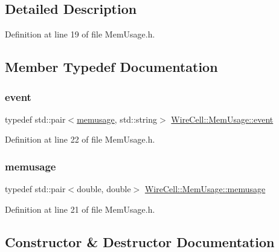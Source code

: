\subsection{Detailed Description}


Definition at line 19 of file Mem\+Usage.\+h.



\subsection{Member Typedef Documentation}
\mbox{\label{class_wire_cell_1_1_mem_usage_ac40a9ad5d6984d90924a179ca77aab3b}} 
\subsubsection{\texorpdfstring{event}{event}}
{\footnotesize\ttfamily typedef std\+::pair$<$\hyperlink{class_wire_cell_1_1_mem_usage_ab022bc829c4166d0161f3c91195f062f}{memusage}, std\+::string$>$ \hyperlink{class_wire_cell_1_1_mem_usage_ac40a9ad5d6984d90924a179ca77aab3b}{Wire\+Cell\+::\+Mem\+Usage\+::event}}



Definition at line 22 of file Mem\+Usage.\+h.

\mbox{\label{class_wire_cell_1_1_mem_usage_ab022bc829c4166d0161f3c91195f062f}} 
\subsubsection{\texorpdfstring{memusage}{memusage}}
{\footnotesize\ttfamily typedef std\+::pair$<$double, double$>$ \hyperlink{class_wire_cell_1_1_mem_usage_ab022bc829c4166d0161f3c91195f062f}{Wire\+Cell\+::\+Mem\+Usage\+::memusage}}



Definition at line 21 of file Mem\+Usage.\+h.



\subsection{Constructor \& Destructor Documentation}
\mbox{\label{class_wire_cell_1_1_mem_usage_a0310c0e9d34fb5b037f95cc147c21d08}} 
